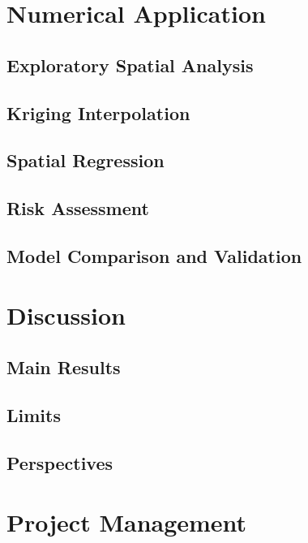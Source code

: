 \documentclass[12pt, a4paper]{report}
\begin{document}
\chapter{Numerical Application}

\section{Exploratory Spatial Analysis}

\section{Kriging Interpolation}

\section{Spatial Regression}

\section{Risk Assessment}

\section{Model Comparison and Validation}

\chapter{Discussion}

\section{Main Results}
\section{Limits}

\section{Perspectives}

\chapter{Project Management}
\end{document}
